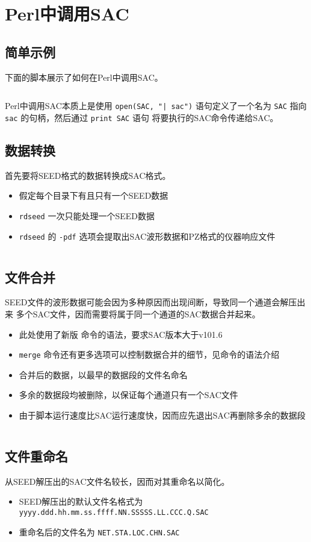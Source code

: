 \section{Perl中调用SAC}
\label{sec:sac-perl}

\subsection{简单示例}
下面的脚本展示了如何在Perl中调用SAC。
\inputminted{perl}{./call-in-script/0.simple-script.pl}
Perl中调用SAC本质上是使用 \texttt{open(SAC, "| sac")} 语句定义了一个名为
\texttt{SAC} 指向 \texttt{sac} 的句柄，然后通过 \texttt{print SAC} 语句
将要执行的SAC命令传递给SAC。

\subsection{数据转换}
首先要将SEED格式的数据转换成SAC格式。
\begin{itemize}
\item 假定每个目录下有且只有一个SEED数据
\item \texttt{rdseed} 一次只能处理一个SEED数据
\item \texttt{rdseed} 的 \texttt{-pdf} 选项会提取出SAC波形数据和PZ格式的仪器响应文件
\end{itemize}
\inputminted{perl}{./call-in-script/1.rdseed.pl}

\subsection{文件合并}
\label{subsec:merge-in-perl}
SEED文件的波形数据可能会因为多种原因而出现间断，导致同一个通道会解压出来
多个SAC文件，因而需要将属于同一个通道的SAC数据合并起来。
\begin{itemize}
\item 此处使用了新版  命令的语法，要求SAC版本大于v101.6
\item \texttt{merge} 命令还有更多选项可以控制数据合并的细节，见命令的语法介绍
\item 合并后的数据，以最早的数据段的文件名命名
\item 多余的数据段均被删除，以保证每个通道只有一个SAC文件
\item 由于脚本运行速度比SAC运行速度快，因而应先退出SAC再删除多余的数据段
\end{itemize}
\inputminted{perl}{./call-in-script/2.merge.pl}

\subsection{文件重命名}
\label{subsec:rename-in-perl}
从SEED解压出的SAC文件名较长，因而对其重命名以简化。
\begin{itemize}
\item SEED解压出的默认文件名格式为 \texttt{yyyy.ddd.hh.mm.ss.ffff.NN.SSSSS.LL.CCC.Q.SAC}
\item 重命名后的文件名为 \texttt{NET.STA.LOC.CHN.SAC}
\end{itemize}
\inputminted{perl}{./call-in-script/3.rename.pl}

